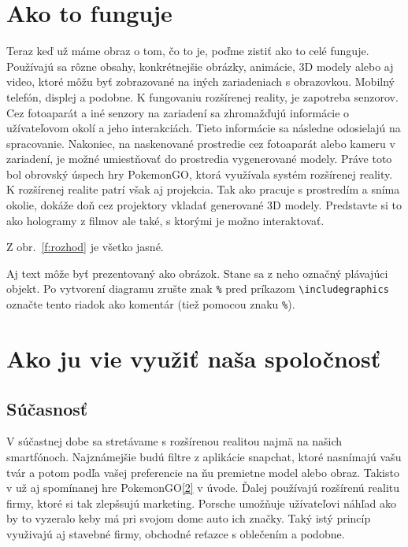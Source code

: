 \documentclass[10pt,twoside,slovak,a4paper]{article}
\begin{document}
\section{Ako to funguje}\label{3}

Teraz keď už máme obraz o tom, čo to je, poďme zistiť ako to celé funguje. Používajú sa rôzne obsahy, konkrétnejšie obrázky, animácie, 3D modely alebo aj video, ktoré môžu byť zobrazované na iných zariadeniach  s obrazovkou. Mobilný telefón, displej a podobne. K fungovaniu rozšírenej reality, je zapotreba senzorov. Cez fotoaparát a iné senzory na zariadení sa zhromažďujú informácie o užívateľovom okolí a jeho interakciách. Tieto informácie sa následne odosielajú na spracovanie. Nakoniec, na naskenované prostredie cez fotoaparát alebo kameru v zariadení, je možné umiestňovať do prostredia vygenerované modely. Práve toto bol obrovský úspech hry PokemonGO, ktorá využívala systém rozšírenej reality. K rozšírenej realite patrí však aj projekcia. Tak ako pracuje s prostredím a sníma okolie, dokáže doň cez projektory vkladať generované 3D modely. Predstavte si to ako hologramy z filmov ale také, s ktorými je možno interaktovať.

Z obr.~\ref{f:rozhod} je všetko jasné. 

\begin{figure*}[tbh]
\centering
Aj text môže byť prezentovaný ako obrázok. Stane sa z neho označný plávajúci objekt. Po vytvorení diagramu zrušte znak \texttt{\%} pred príkazom \verb|\includegraphics| označte tento riadok ako komentár (tiež pomocou znaku \texttt{\%}).
\caption{Rozhodujúci argument.}
\label{f:rozhod}
\end{figure*}



\section{Ako ju vie využiť naša spoločnosť} \label{4}
\subsection{Súčasnosť}\label{4:1}
V súčastnej dobe sa stretávame s rozšírenou realitou najmä na našich smartfónoch. Najznámejšie budú filtre z aplikácie snapchat, ktoré nasnímajú vašu tvár a potom podľa vašej preferencie na ňu premietne model alebo obraz. Takisto v už aj spomínanej hre PokemonGO\ref{2} v úvode. Ďalej používajú rozšírenú realitu firmy, ktoré si tak zlepšsujú marketing. Porsche umožňuje užívateľovi náhľad ako by to vyzeralo keby má pri svojom dome auto ich značky. Taký istý princíp využivajú aj stavebné firmy, obchodné reťazce s oblečením a podobne.
\end{document}
